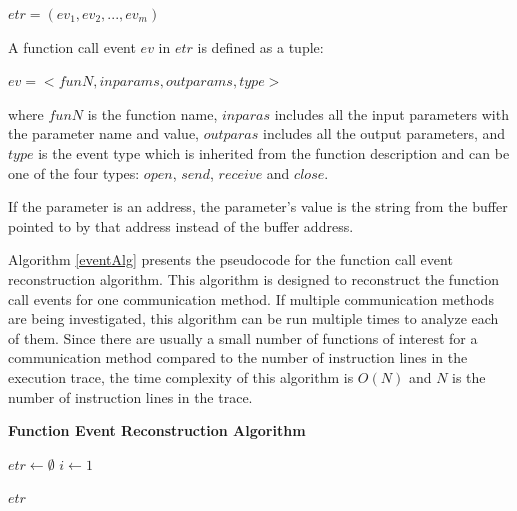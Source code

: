 $etr = (ev_1, ev_2, ..., ev_m)$

A function call event $ev$ in $etr$ is defined as a tuple:

$ev = <funN, inparams, outparams, type>$

where $funN$ is the function name, $inparas$ includes all the input parameters with the parameter name and value, $outparas$ includes all the output parameters, and $type$ is the event type which is inherited from the function description and can be one of the four types: $open$, $send$, $receive$ and $close$.


If the parameter is an address, the parameter's value is the string from the buffer pointed to by that address instead of the buffer address.

Algorithm \ref{eventAlg} presents the pseudocode for the function call event reconstruction algorithm. This algorithm is designed to reconstruct the function call events for one communication method. If multiple communication methods are being investigated, this algorithm can be run multiple times to analyze each of them. Since there are usually a small number of functions of interest for a communication method compared to the number of instruction lines in the execution trace, the time complexity of this algorithm is $O(N)$ and $N$ is the number of instruction lines in the trace.

\begin{algorithm}[H]
\DontPrintSemicolon
\caption{{\bf Function Event Reconstruction Algorithm} \label{eventAlg}}
$etr \leftarrow \emptyset$\; 
$i \leftarrow 1$\;

\KwRet $etr$\;
\end{algorithm} 

